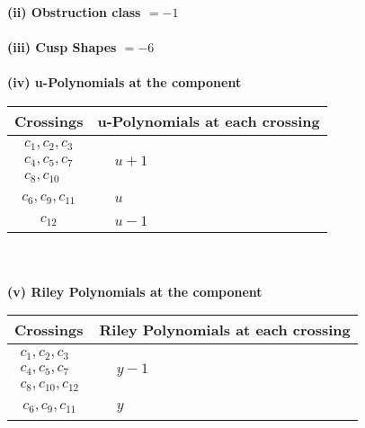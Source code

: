 \documentclass[1p]{elsarticle_modified}
\theoremstyle{definition}
\begin{document}
\flushleft \textbf{(ii) Obstruction class $= -1$}\\~\\
\flushleft \textbf{(iii) Cusp Shapes $= -6$}\\~\\
\newpage\renewcommand{\arraystretch}{1}
\flushleft \textbf{(iv) u-Polynomials at the component}\newline \\
\begin{tabular}{m{50pt}|m{274pt}}
Crossings & \hspace{64pt}u-Polynomials at each crossing \\
\hline $$\begin{aligned}c_{1},c_{2},c_{3}\\c_{4},c_{5},c_{7}\\c_{8},c_{10}\end{aligned}$$&$\begin{aligned}
&u+1
\end{aligned}$\\
\hline $$\begin{aligned}c_{6},c_{9},c_{11}\end{aligned}$$&$\begin{aligned}
&u
\end{aligned}$\\
\hline $$\begin{aligned}c_{12}\end{aligned}$$&$\begin{aligned}
&u-1
\end{aligned}$\\
\hline
\end{tabular}\\~\\
\newpage\renewcommand{\arraystretch}{1}
\flushleft \textbf{(v) Riley Polynomials at the component}\newline \\
\begin{tabular}{m{50pt}|m{274pt}}
Crossings & \hspace{64pt}Riley Polynomials at each crossing \\
\hline $$\begin{aligned}c_{1},c_{2},c_{3}\\c_{4},c_{5},c_{7}\\c_{8},c_{10},c_{12}\end{aligned}$$&$\begin{aligned}
&y-1
\end{aligned}$\\
\hline $$\begin{aligned}c_{6},c_{9},c_{11}\end{aligned}$$&$\begin{aligned}
&y
\end{aligned}$\\
\hline
\end{tabular}\\~\\
\end{document}
